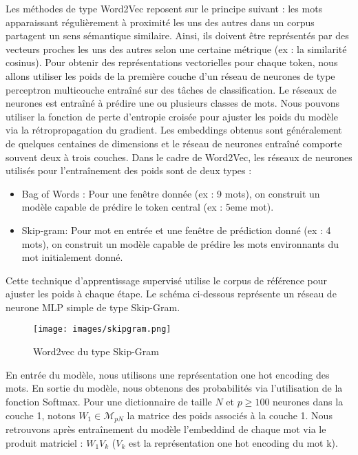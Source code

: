 \documentclass[12pt]{article}
\theoremstyle{definition}
\begin{document}
	Les méthodes de type Word2Vec \cite{word2vec} reposent sur le principe suivant : les mots apparaissant régulièrement à proximité les uns des autres dans un corpus partagent un sens sémantique similaire. Ainsi, ils doivent être représentés par des vecteurs proches les uns des autres selon une certaine métrique (ex : la similarité cosinus). Pour obtenir des représentations vectorielles pour chaque token, nous allons utiliser les poids de la première couche d'un réseau de neurones de type perceptron multicouche entraîné sur des tâches de classification. Le réseaux de neurones est entraîné à prédire une ou plusieurs classes de mots. Nous pouvons utiliser la fonction de perte d'entropie croisée pour ajuster les poids du modèle via la rétropropagation du gradient. Les embeddings obtenus sont généralement de quelques centaines de dimensions et le réseau de neurones entraîné comporte souvent deux à trois couches. Dans le cadre de Word2Vec, les réseaux de neurones utilisés pour l'entraînement des poids sont de deux types :
	\begin{itemize}
		\item Bag of Words : Pour une fenêtre donnée (ex : 9 mots), on construit un modèle  capable de prédire le token central (ex : 5eme mot). 
		\item Skip-gram: Pour mot en entrée et une fenêtre de prédiction donné (ex : 4 mots), on construit un modèle capable de prédire les mots environnants du mot initialement donné.
	\end{itemize}
	
	Cette technique d'apprentissage supervisé utilise le corpus de référence pour ajuster les poids à chaque étape. Le schéma ci-dessous représente un réseau de neurone MLP simple de type Skip-Gram. 
	
	\begin{figure*}[!h]
	\centering
	\texttt{[image: images/skipgram.png]}
	\caption{Word2vec du type Skip-Gram }
\end{figure*}
	
	
	En entrée du modèle, nous utilisons une représentation one hot encoding des mots. En sortie du modèle, nous obtenons des probabilités via l'utilisation de la fonction Softmax. Pour une dictionnaire de taille $N$ et $p\geq 100$ neurones dans la couche 1, notons $W_1 \in \mathcal{M}_{pN}$ la matrice des poids associés à la couche 1. Nous retrouvons après entraînement du modèle l'embeddind de chaque mot via le produit matriciel : $W_1V_k$ ($V_k$ est la représentation one hot encoding du mot k).\\   
	
\end{document}
